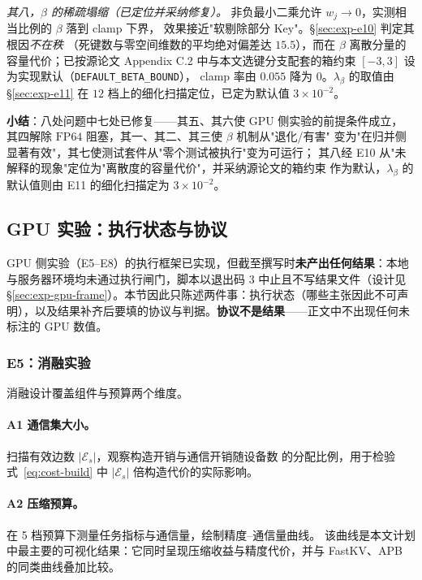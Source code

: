 \emph{其八，$\beta$ 的稀疏塌缩（已定位并采纳修复）。}
非负最小二乘允许 $w_j\to0$，实测相当比例的 $\beta$ 落到 clamp 下界，
效果接近"软剔除部分 Key"。\S\ref{sec:exp-e10} 判定其根因\emph{不在秩}
（死键数与零空间维数的平均绝对偏差达 $15.5$），而在 $\beta$ 离散分量的
容量代价；已按源论文 Appendix C.2 中与本文选键分支配套的箱约束 $[-3,3]$
设为实现默认（\texttt{DEFAULT\_}\allowbreak\texttt{BETA\_}\allowbreak\texttt{BOUND}），
clamp 率由 $0.055$ 降为 $0$。$\lambda_\beta$ 的取值由 \S\ref{sec:exp-e11}
在 $12$ 档上的细化扫描定位，已定为默认值 $3\times10^{-2}$。

\textbf{小结}：八处问题中七处已修复——其五、其六使 GPU 侧实验的前提条件成立，
其四解除 $\mathrm{FP64}$ 阻塞，其一、其二、其三使 $\beta$ 机制从"退化/有害"
变为"在归并侧显著有效"，其七使测试套件从"零个测试被执行"变为可运行；
其八经 E10 从"未解释的现象"定位为"离散度的容量代价"，并采纳源论文的箱约束
作为默认，$\lambda_\beta$ 的默认值则由 E11 的细化扫描定为 $3\times10^{-2}$。

\subsection{GPU 实验：执行状态与协议}
\label{sec:exp-gpu}

GPU 侧实验（E5--E8）的执行框架已实现，但截至撰写时\textbf{未产出任何结果}：本地与服务器环境均未通过执行闸门，脚本以退出码 $3$ 中止且不写结果文件（设计见 \S\ref{sec:exp-gpu-frame}）。本节因此只陈述两件事：执行状态（哪些主张因此不可声明），以及结果补齐后要填的协议与判据。\textbf{协议不是结果}——正文中不出现任何未标注的 GPU 数值。

\subsubsection{E5：消融实验}

消融设计覆盖组件与预算两个维度。

\paragraph{A1 通信集大小。}扫描有效边数 $|\mathcal{E}_s|$，观察构造开销与通信开销随设备数
的分配比例，用于检验式~\eqref{eq:cost-build} 中 $|\mathcal{E}_s|$ 倍构造代价的实际影响。

\paragraph{A2 压缩预算。}在 5 档预算下测量任务指标与通信量，绘制精度--通信量曲线。
该曲线是本文计划中最主要的可视化结果：它同时呈现压缩收益与精度代价，并与
FastKV、APB 的同类曲线叠加比较。

